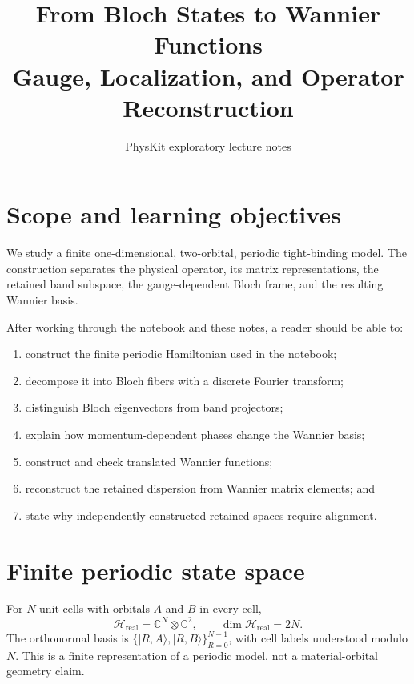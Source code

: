 \documentclass[11pt]{article}
\title{From Bloch States to Wannier Functions\\
\large Gauge, Localization, and Operator Reconstruction}
\author{PhysKit exploratory lecture notes}
\date{}
\newcommand{\Hilbert}{\mathcal H}
\newcommand{\C}{\mathbb C}
\newcommand{\ket}[1]{\lvert #1\rangle}
\begin{document}
\maketitle

\begin{center}
\end{center}

\section{Scope and learning objectives}

We study a finite one-dimensional, two-orbital, periodic tight-binding model.
The construction separates the physical operator, its matrix representations,
the retained band subspace, the gauge-dependent Bloch frame, and the resulting
Wannier basis.

After working through the notebook and these notes, a reader should be able to:
\begin{enumerate}[label=\arabic*.]
  \item construct the finite periodic Hamiltonian used in the notebook;
  \item decompose it into Bloch fibers with a discrete Fourier transform;
  \item distinguish Bloch eigenvectors from band projectors;
  \item explain how momentum-dependent phases change the Wannier basis;
  \item construct and check translated Wannier functions;
  \item reconstruct the retained dispersion from Wannier matrix elements; and
  \item state why independently constructed retained spaces require alignment.
\end{enumerate}

\section{Finite periodic state space}

For $N$ unit cells with orbitals $A$ and $B$ in every cell,
\begin{equation}
  \Hilbert_{\mathrm{real}}=\C^N\otimes\C^2,
  \qquad \dim\Hilbert_{\mathrm{real}}=2N.
\end{equation}
The orthonormal basis is
$\{\ket{R,A},\ket{R,B}\}_{R=0}^{N-1}$, with cell labels understood modulo $N$.
This is a finite representation of a periodic model, not a material-orbital
geometry claim.
\end{document}
